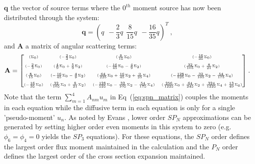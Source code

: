 $\mathbf{q}$ the vector of source terms where the $0^{th}$ moment
source has now been distributed through the system:
\begin{equation}
  \mathbf{q} = (
  q\ \ -\frac{2}{3}q\ \ \frac{8}{15}q\ \ -\frac{16}{35}q )^T\:,
  \label{eq:spn7_source_vector}
\end{equation}
and $\mathbf{A}$ a matrix of angular scattering terms:
\begin{equation}
  \mathbf{A} = 
  {\tiny \begin{bmatrix}
    (\Sigma_0) &
    (-\frac{2}{3}\Sigma_0) &
    (\frac{8}{15}\Sigma_0) &
    (-\frac{16}{35}\Sigma_0) \\
    &&&\\
    (-\frac{2}{3}\Sigma_0) &
    (\frac{4}{9}\Sigma_0 + \frac{5}{9}\Sigma_2) &
    (-\frac{16}{45}\Sigma_0 - \frac{4}{9}\Sigma_2) &
    (\frac{32}{105}\Sigma_0 + \frac{8}{21}\Sigma_2) \\
    &&&\\
    (\frac{8}{15}\Sigma_0) &
    (-\frac{16}{45}\Sigma_0 - \frac{4}{9}\Sigma_2) &
    (\frac{64}{225}\Sigma_0 + \frac{16}{45}\Sigma_2 + \frac{9}{25}\Sigma_4) &
    (-\frac{128}{525}\Sigma_0 - \frac{32}{105}\Sigma_2 - \frac{54}{175}\Sigma_4)
    \\ 
    &&&\\
    (-\frac{16}{35}\Sigma_0) &
    (\frac{32}{105}\Sigma_0 + \frac{8}{21}\Sigma_2) &
    (-\frac{128}{525}\Sigma_0 - \frac{32}{105}\Sigma_2 - \frac{54}{175}\Sigma_4)
    & 
    (\frac{256}{1225}\Sigma_0 + \frac{64}{245}\Sigma_2 +
    \frac{324}{1225}\Sigma_4 + \frac{13}{49}\Sigma_6)
  \end{bmatrix}}\:.
  \label{eq:A_matrix}
\end{equation}
Note that the term $\sum_{m=1}^4 A_{nm} u_m$ in
Eq~(\ref{eq:spn_matrix}) couples the moments in each equation while
the diffusive term in each equation is only for a single
'pseudo-moment' $u_n$. As noted by Evans \cite{evans_simplified_2013},
lower order $SP_N$ approximations can be generated by setting higher
order even moments in this system to zero (e.g. $\phi_6 = \phi_4 = 0$
yields the $SP_3$ equations). For these equations, the $SP_N$ order
defines the largest order flux moment maintained in the calculation
and the $P_N$ order defines the largest order of the cross section
expansion maintained.

